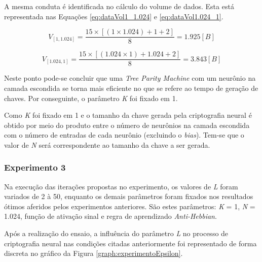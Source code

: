 \documentclass[12pt]{article}
\begin{document}
                A mesma conduta é identificada no cálculo do volume de dados. Esta está representada nas Equações \eqref{eq:dataVol1_1.024} e \eqref{eq:dataVol1.024_1}.
                
                \begin{equation}
                    \label{eq:dataVol1_1.024}
                    V_{[1, 1.024]} = \frac{15 \times [(1 \times 1.024) + 1 + 2]}{8} = 1.925 [B]
                \end{equation}

                \begin{equation}
                    \label{eq:dataVol1.024_1}
                    V_{[1.024, 1]} = \frac{15 \times [(1.024 \times 1) + 1.024 + 2]}{8} = 3.843 [B]
                \end{equation}

                Neste ponto pode-se concluir que uma \textit{Tree Parity Machine} com um neurônio na camada escondida se torna mais eficiente no que se refere ao tempo de geração de chaves. Por conseguinte, o parâmetro \textit{K} foi fixado em 1.
                
                Como \textit{K} foi fixado em 1 e o tamanho da chave gerada pela criptografia neural é obtido por meio do produto entre o número de neurônios na camada escondida com o número de entradas de cada neurônio (excluindo o \textit{bias}). Tem-se que o valor de \textit{N} será correspondente ao tamanho da chave a ser gerada.
                
            \subsubsection{Experimento 3}
            \label{subsubsec:experimentoEpsilon}

                Na execução das iterações propostas no experimento, os valores de \textit{L} foram variados de 2 à 50, enquanto os demais parâmetros foram fixados nos resultados ótimos aferidos pelos experimentos anteriores. São estes parâmetros: \textit{K} = 1, \textit{N} = 1.024, função de ativação sinal e regra de aprendizado \textit{Anti-Hebbian}.
                
                Após a realização do ensaio, a influência do parâmetro \textit{L} no processo de criptografia neural nas condições citadas anteriormente foi representado de forma discreta no gráfico da Figura \ref{graph:experimentoEpsilon}.
\end{document}
